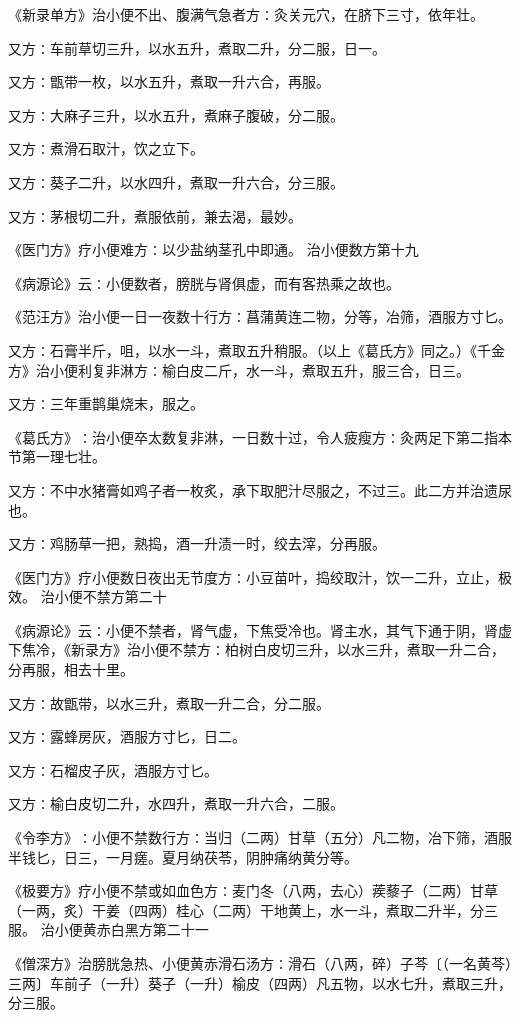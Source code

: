 \documentclass[a4paper,12pt,UTF8,twoside]{ctexbook}
\begin{document}
《新录单方》治小便不出、腹满气急者方∶灸关元穴，在脐下三寸，依年壮。

又方∶车前草切三升，以水五升，煮取二升，分二服，日一。

又方∶甑带一枚，以水五升，煮取一升六合，再服。

又方∶大麻子三升，以水五升，煮麻子腹破，分二服。

又方∶煮滑石取汁，饮之立下。

又方∶葵子二升，以水四升，煮取一升六合，分三服。

又方∶茅根切二升，煮服依前，兼去渴，最妙。

《医门方》疗小便难方∶以少盐纳茎孔中即通。
治小便数方第十九

《病源论》云∶小便数者，膀胱与肾俱虚，而有客热乘之故也。

《范汪方》治小便一日一夜数十行方∶菖蒲黄连二物，分等，冶筛，酒服方寸匕。

又方∶石膏半斤，咀，以水一斗，煮取五升稍服。（以上《葛氏方》同之。）《千金方》治小便利复非淋方∶榆白皮二斤，水一斗，煮取五升，服三合，日三。

又方∶三年重鹊巢烧末，服之。

《葛氏方》∶治小便卒太数复非淋，一日数十过，令人疲瘦方∶灸两足下第二指本节第一理七壮。

又方∶不中水猪膏如鸡子者一枚炙，承下取肥汁尽服之，不过三。此二方并治遗尿也。

又方∶鸡肠草一把，熟捣，酒一升渍一时，绞去滓，分再服。

《医门方》疗小便数日夜出无节度方∶小豆苗叶，捣绞取汁，饮一二升，立止，极效。
治小便不禁方第二十

《病源论》云∶小便不禁者，肾气虚，下焦受冷也。肾主水，其气下通于阴，肾虚下焦冷，《新录方》治小便不禁方∶柏树白皮切三升，以水三升，煮取一升二合，分再服，相去十里。

又方∶故甑带，以水三升，煮取一升二合，分二服。

又方∶露蜂房灰，酒服方寸匕，日二。

又方∶石榴皮子灰，酒服方寸匕。

又方∶榆白皮切二升，水四升，煮取一升六合，二服。

《令李方》∶小便不禁数行方∶当归（二两）甘草（五分）凡二物，冶下筛，酒服半钱匕，日三，一月瘥。夏月纳茯苓，阴肿痛纳黄分等。

《极要方》疗小便不禁或如血色方∶麦门冬（八两，去心）蒺藜子（二两）甘草（一两，炙）干姜（四两）桂心（二两）干地黄上，水一斗，煮取二升半，分三服。
治小便黄赤白黑方第二十一

《僧深方》治膀胱急热、小便黄赤滑石汤方∶滑石（八两，碎）子芩〔（一名黄芩）三两〕车前子（一升）葵子（一升）榆皮（四两）凡五物，以水七升，煮取三升，分三服。
\end{document}

